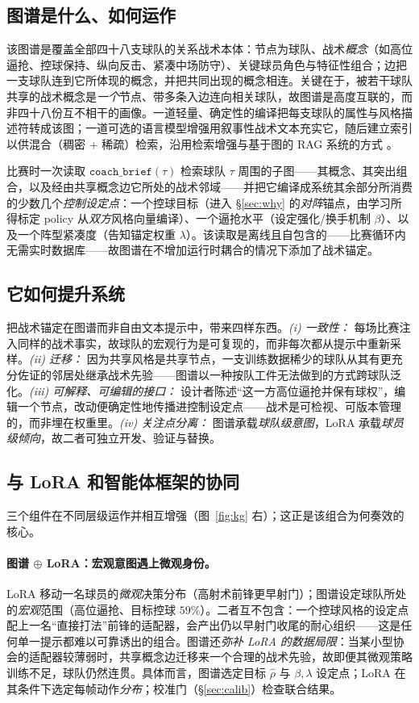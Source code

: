 \documentclass[11pt,UTF8,fontset=fandol]{ctexart}
\theoremstyle{plain}
\theoremstyle{definition}
\theoremstyle{remark}
\begin{document}
\subsection{图谱是什么、如何运作}

该图谱是覆盖全部四十八支球队的关系战术本体：节点为球队、战术\emph{概念}（如高位逼抢、控球保持、纵向反击、紧凑中场防守）、关键球员角色与特征性组合；边把一支球队连到它所体现的概念，并把共同出现的概念相连。关键在于，被若干球队共享的战术概念是\emph{一个}节点、带多条入边连向相关球队，故图谱是高度互联的，而非四十八份互不相干的画像。一道轻量、确定性的编译把每支球队的属性与风格描述符转成该图；一道可选的语言模型增强用叙事性战术文本充实它，随后建立索引以供混合（稠密 $+$ 稀疏）检索，沿用检索增强与基于图的 RAG 系统的方式 \citep{lewis2020,edge2024graphrag}。

比赛时一次读取 $\texttt{coach\_brief}(\tau)$ 检索球队 $\tau$ 周围的子图——其概念、其突出组合，以及经由共享概念边它所处的战术邻域——并把它编译成系统其余部分所消费的少数几个\emph{控制设定点}：一个控球目标（进入 \S\ref{sec:why} 的\emph{对阵}锚点，由学习所得标定 policy 从\emph{双方}风格向量编译）、一个逼抢水平（设定强化/换手机制 $\beta$）、以及一个阵型紧凑度（告知锚定权重 $\lambda$）。该读取是离线且自包含的——比赛循环内无需实时数据库——故图谱在不增加运行时耦合的情况下添加了战术锚定。

\subsection{它如何提升系统}

把战术锚定在图谱而非自由文本提示中，带来四样东西。\emph{(i) 一致性：} 每场比赛注入同样的战术事实，故球队的宏观行为是可复现的，而非每次都从提示中重新采样。\emph{(ii) 迁移：} 因为共享风格是共享节点，一支训练数据稀少的球队从其有更充分佐证的邻居处继承战术先验——图谱以一种按队工件无法做到的方式跨球队泛化。\emph{(iii) 可解释、可编辑的接口：} 设计者陈述“这一方高位逼抢并保有球权”，编辑一个节点，改动便确定性地传播进控制设定点——战术是可检视、可版本管理的，而非埋在权重里。\emph{(iv) 关注点分离：} 图谱承载\emph{球队级意图}，LoRA 承载\emph{球员级倾向}，故二者可独立开发、验证与替换。

\subsection{与 LoRA 和智能体框架的协同}

三个组件在不同层级运作并相互增强（图~\ref{fig:kg} 右）；这正是该组合为何奏效的核心。

\paragraph{图谱 $\oplus$ LoRA：宏观意图遇上微观身份。} LoRA 移动一名球员的\emph{微观}决策分布（高射术前锋更早射门）；图谱设定球队所处的\emph{宏观}范围（高位逼抢、目标控球 $59\%$）。二者互不包含：一个控球风格的设定点配上一名“直接打法”前锋的适配器，会产出仍以早射门收尾的耐心组织——这是任何单一提示都难以可靠诱出的组合。图谱还\emph{弥补 LoRA 的数据局限}：当某小型协会的适配器较薄弱时，共享概念边迁移来一个合理的战术先验，故即便其微观策略训练不足，球队仍然连贯。具体而言，图谱选定目标 $\hat\rho$ 与 $\beta,\lambda$ 设定点；LoRA 在其条件下选定每帧动作\emph{分布}；校准门（\S\ref{sec:calib}）检查联合结果。
\end{document}
